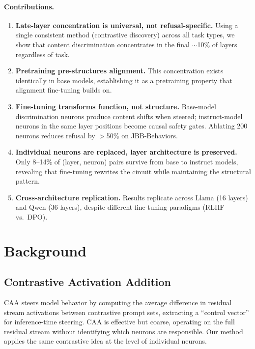 \documentclass{article}
\begin{document}
\paragraph{Contributions.}
\begin{enumerate}
\item \textbf{Late-layer concentration is universal, not refusal-specific.} Using a single consistent method (contrastive discovery) across all task types, we show that content discrimination concentrates in the final ${\sim}$10\% of layers regardless of task.
\item \textbf{Pretraining pre-structures alignment.} This concentration exists identically in base models, establishing it as a pretraining property that alignment fine-tuning builds on.
\item \textbf{Fine-tuning transforms function, not structure.} Base-model discrimination neurons produce content shifts when steered; instruct-model neurons in the same layer positions become causal safety gates. Ablating 200 neurons reduces refusal by $>$50\% on JBB-Behaviors.
\item \textbf{Individual neurons are replaced, layer architecture is preserved.} Only 8--14\% of (layer, neuron) pairs survive from base to instruct models, revealing that fine-tuning rewrites the circuit while maintaining the structural pattern.
\item \textbf{Cross-architecture replication.} Results replicate across Llama (16 layers) and Qwen (36 layers), despite different fine-tuning paradigms (RLHF vs.\ DPO).
\end{enumerate}

\section{Background}
\label{sec:background}

\subsection{Contrastive Activation Addition}

CAA \citep{rimsky2024steering} steers model behavior by computing the average difference in residual stream activations between contrastive prompt sets, extracting a ``control vector'' for inference-time steering.
CAA is effective but coarse, operating on the full residual stream without identifying which neurons are responsible.
Our method applies the same contrastive idea at the level of individual neurons.
\end{document}
